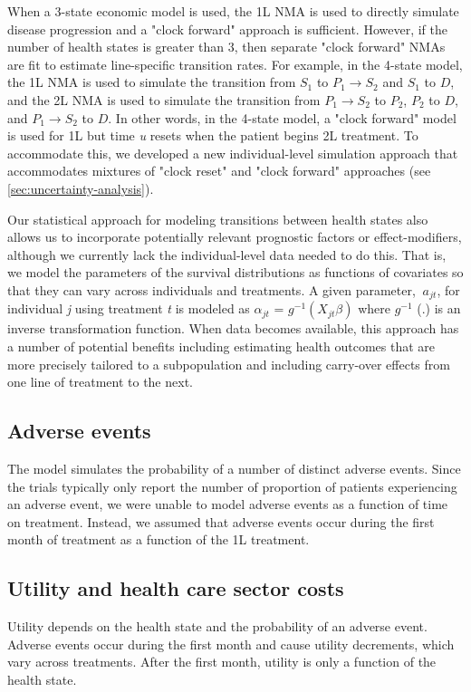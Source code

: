 \documentclass[11pt,final,fleqn]{article}\usepackage[]{graphicx}\usepackage[]{color}
\theoremstyle{plain}
\begin{document}
{When a 3-state economic model is used, the 1L NMA is used to directly simulate disease progression and a "clock forward" approach is sufficient. However, if the number of health states is greater than $3$, then separate "clock forward" NMAs are fit to estimate line-specific transition rates. For example, in the 4-state model, the 1L NMA is used to simulate the transition from $S_1$ to $P_1 \rightarrow S_2$ and $S_1$ to $D$, and the 2L NMA is used to simulate the transition from $P_1 \rightarrow S_2$ to $P_2$, $P_2$ to $D$, and $P_1 \rightarrow S_2$ to $D$. In other words, in the 4-state model, a "clock forward" model is used for 1L but time \textit{u} resets when the patient begins 2L treatment. To accommodate this, we developed a new individual-level simulation approach that accommodates mixtures of "clock reset" and "clock forward" approaches (see \autoref{sec:uncertainty-analysis}).

Our statistical approach for modeling transitions between health states also allows us to incorporate potentially relevant prognostic factors or effect-modifiers, although we currently lack the individual-level data needed to do this. That is, we model the parameters of the survival distributions as functions of covariates so that they can vary across individuals and treatments. A given parameter, $\ a_{jt} $, for individual \textit{j} using treatment \textit{t} is modeled as $ \alpha_{jt} $ = $ \textit{g}^{-1} (X_{jt}\beta) $ where $ \textit{g}^{-1} $ (.) is an inverse transformation function. When data becomes available, this approach has a number of potential benefits including estimating health outcomes that are more precisely tailored to a subpopulation and including carry-over effects from one line of treatment to the next.


\FloatBarrier

\subsection{Adverse events}
The model simulates the probability of a number of distinct adverse events. Since the trials typically only report the number of proportion of patients experiencing an adverse event, we were unable to model adverse events as a function of time on treatment. Instead, we assumed that adverse events occur during the first month of treatment as a function of the 1L treatment.

\subsection{Utility and health care sector costs}
Utility depends on the health state and the probability of an adverse event. Adverse events occur during the first month and cause utility decrements, which vary across treatments. After the first month, utility is only a function of the health state. 

}
\end{document}
